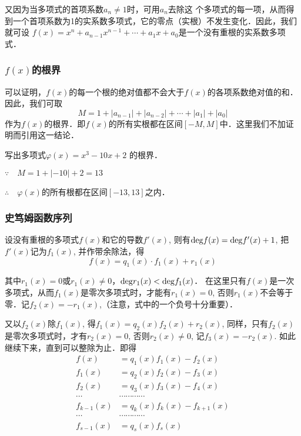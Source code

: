 又因为当多项式的首项系数$a_n\ne 1$时，可用$a_n$去除这
个多项式的每一项，从而得到一个首项系数为1的实系数多项式，它的零点（实根）不发生变化．因此，我们就可设
$f (x) =x^n+a_{n-1}x^{n-1}+\cdots +a_1x +a_0$是一个没有重根的实系数多项式．

\subsubsection{$f(x)$的根界}

可以证明，$f(x)$的每一个根的绝对值都不会大于$f(x)$的各项系数绝对值的和．因此，我们可取
\[M=1+|a_{n-1}|+|a_{n-2}|+\cdots+|a_1|+|a_0|\]
作为$f(x)$的根界．即$f(x)$的所有实根都在区间$[-M,M]$中．这里我们不加证明而引用这一结论．

\begin{example}
    写出多项式$\varphi(x)=x^3-10x+2$ 的根界．
\end{example}

\begin{solution}
 $\because\quad    M=1+|-10|+2=13$
 
 $\therefore\quad \varphi(x)$的所有根都在区间$[-13, 13]$之内．
\end{solution}

\subsubsection{史笃姆函数序列}
设没有重根的多项式$f(x)$和它的导数$f'(x)$, 则有${\rm deg}f(x)={\rm deg}f'(x)+1$, 把$f'(x)$记为$f_1(x)$, 并作带余除法，得
\[f (x) =q_1 (x)\cdot f_1(x)+r_1(x)\]

其中$r_1(x)=0$或$r_1(x)\ne 0$，${\rm deg}r_1(x)<{\rm deg}f_1(x)$．
在这里只有$f(x)$是一次多项式，从而$f_1(x)$是零次多项式时，才能有$r_1(x)=0$, 否则$r_1(x)$不会等于零．记$f_2(x)=-r_1(x)$,（注意，式中的一个负号十分重要）．

又以$f_2(x)$除$f_1(x)$, 得$f_1(x)=q_2(x)f_2(x)+r_2(x)$, 同样，只有$f_2(x)$是零次多项式时，才有$r_2(x)=0$, 否则$r_2(x)\ne 0$, 记$f_3(x)=-r_2(x)$. 如此继续下来，直到可以整除为止．即得
\[\begin{split}
    f(x)&=q_1(x)f_1(x)-f_2(x)\\
    f_1(x)&=q_2(x)f_2(x)-f_3(x)\\
    f_2(x)&=q_3(x)f_3(x)-f_4(x)\\
    \cdots &\cdots \cdots \cdots \cdots \\
    f_{k-1}(x)&=q_k(x)f_k(x)-f_{k+1}(x)\\
    \cdots &\cdots \cdots \cdots \cdots \\
    f_{s-1}(x)&=q_s(x)f_s(x)\\
\end{split}\]

